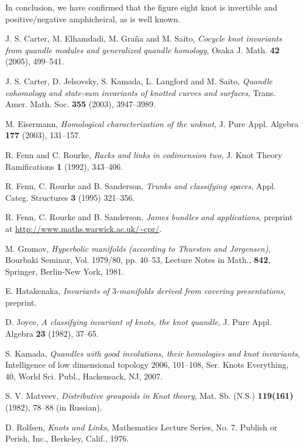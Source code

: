 \documentclass[12pt]{amsart}
\theoremstyle{definition}
\begin{document}
\noindent
In conclusion, we have confirmed that the figure eight knot is invertible and positive/negative amphicheiral, as is well known.


\begin{thebibliography}{99}

J. S. Carter, M. Elhamdadi, M. Gra\~{n}a and M. Saito, {\it Cocycle knot invariants from quandle modules and generalized quandle homology}, Osaka J. Math. {\bf 42} (2005), 499--541.

J. S. Carter, D. Jelsovsky, S. Kamada, L. Langford and M. Saito, {\it Quandle cohomology and state-sum invariants of knotted curves and surfaces}, Trans. Amer. Math. Soc. {\bf 355} (2003), 3947--3989.

M. Eisermann, {\it Homological characterization of the unknot}, J. Pure Appl. Algebra {\bf 177} (2003), 131--157.

R. Fenn and C. Rourke, {\it Racks and links in codimension two}, J. Knot Theory Ramifications {\bf 1} (1992), 343--406.

R. Fenn, C. Rourke and B. Sanderson, {\it Trunks and classifying spaces}, Appl. Categ. Structures {\bf 3} (1995) 321--356.

R. Fenn, C. Rourke and B. Sanderson, {\it James bundles and applications}, preprint at \url{http://www.maths.warwick.ac.uk/~cpr/}.

M. Gromov, {\it Hyperbolic manifolds {\upshape (}according to Thurston and J{\o}rgensen{\upshape )}}, Bourbaki Seminar, Vol. 1979/80, pp. 40--53, Lecture Notes in Math., {\bf 842}, Springer, Berlin-New York, 1981.

E. Hatakenaka, {\it Invariants of $3$-manifolds derived from covering presentations}, preprint.

D. Joyce, {\it A classifying invariant of knots, the knot quandle}, J. Pure Appl. Algebra {\bf 23} (1982), 37--65.

S. Kamada, {\it Quandles with good involutions, their homologies and knot invariants}, Intelligence of low dimensional topology 2006, 101--108, Ser. Knots Everything, 40, World Sci. Publ., Hackensack, NJ, 2007.

S. V. Matveev, {\it Distributive groupoids in Knot theory}, Mat. Sb. (N.S.) {\bf 119(161)} (1982), 78--88 (in Russian).

D. Rolfsen, {\it Knots and Links}, Mathematics Lecture Series, No. 7. Publish or Perish, Inc., Berkeley, Calif., 1976.


\end{thebibliography}
\end{document}
